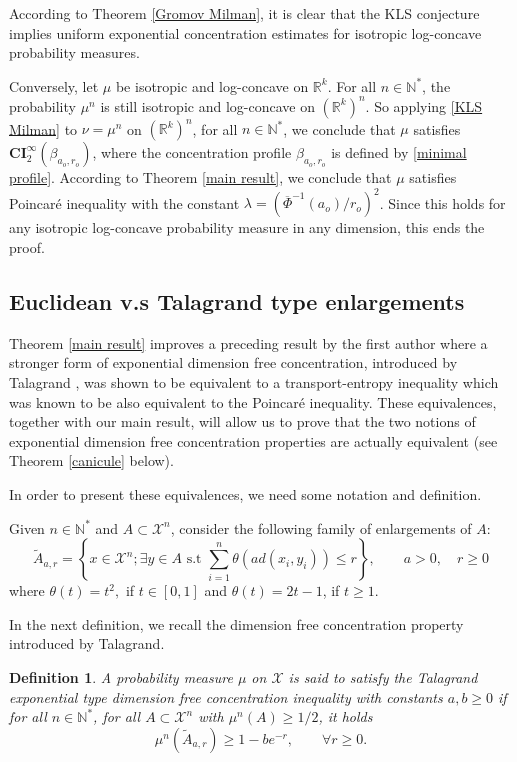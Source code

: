 \documentclass[11pt]{amsart}
\newtheorem{defi}[equation]{Definition}
\numberwithin{equation}{section}
\begin{document}
According to Theorem \ref{Gromov Milman}, it is clear that the KLS conjecture implies uniform exponential concentration estimates for isotropic log-concave probability measures.

Conversely, let $\mu$ be isotropic and log-concave on ${\mathbb{R}}^k$. For all $n\in {\mathbb{N}}^*$, the probability $\mu^n$ is still isotropic and log-concave on $\left({\mathbb{R}}^k\right)^n$. So applying \eqref{KLS Milman} to $\nu=\mu^n$ on $\left({\mathbb{R}}^k\right)^n$, for all $n\in {\mathbb{N}}^*$, we conclude that $\mu$ satisfies $\mathbf{CI}_2^\infty(\beta_{a_o,r_o})$, where the concentration profile $\beta_{a_o,r_o}$ is defined by \eqref{minimal profile}. According to Theorem \ref{main result}, we conclude that $\mu$ satisfies Poincar\'e inequality with the constant $\lambda= \left(\overline{\Phi}^{-1}(a_o)/r_o\right)^2$. Since this holds for any isotropic log-concave probability measure in any dimension, this ends the proof.
\endproof

\subsection{Euclidean v.s Talagrand type enlargements}
Theorem \ref{main result} improves a preceding result by the first author \cite{Goz09} where a stronger form of exponential dimension free concentration, introduced by Talagrand \cite{Tal91,Tal95}, was shown to be equivalent to a transport-entropy inequality which was known to be also equivalent to the Poincar\'e inequality.
These equivalences, together with our main result, will allow us to prove that the two
notions of exponential dimension free concentration properties are actually equivalent (see Theorem \ref{canicule} below).

In order to present these equivalences, we need some notation and definition.

Given  $n\in {\mathbb{N}}^*$ and $A \subset {\mathcal{X}}^n$, consider the following family of enlargements of $A$: 
\[
\widetilde{A}_{a,r} =\left\{x \in {\mathcal{X}}^n ; \exists y\in A \text{ s.t } \sum_{i=1}^n \theta(ad(x_i,y_i))\leq r\right\},\qquad a >0,\quad r\geq0
\]
where $\theta(t) = t^2,$ if $t\in [0,1]$ and $\theta(t)=2t-1$, if $t\geq1.$

In the next definition, we recall the dimension free concentration property introduced by Talagrand.

\begin{defi}
A probability measure $\mu$ on ${\mathcal{X}}$ is said to satisfy the Talagrand exponential type dimension free concentration inequality with constants $a,b\geq0$ if for all $n\in {\mathbb{N}}^*$, for all $A\subset {\mathcal{X}}^n$ with $\mu^n(A)\geq1/2$, it holds
\begin{equation}\label{concentration Talagrand}
\mu^n(\widetilde{A}_{a,r})\geq 1-be^{-r},\qquad \forall r\geq0.
\end{equation}
\end{defi}
\end{document}
